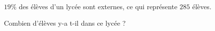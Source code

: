 \begin{exo}{}
	$19\%$ des élèves d'un lycée sont externes, ce qui représente $285$ élèves.


	Combien d'élèves y-a t-il dans ce lycée ?
\end{exo}
